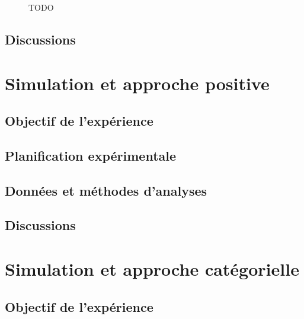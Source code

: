 \begin{figure}[bth]
       \caption[TODO]{TODO}\label{fig:soundlevelMarkerDiff}
\end{figure}

\subsection{Discussions}

\section{Simulation et approche positive}
\label{sec:xp3}

\subsection{Objectif de l'expérience}

\subsection{Planification expérimentale}

\subsection{Données et méthodes d'analyses}

\subsection{Discussions}

\section{Simulation et approche catégorielle}
\label{sec:xp4}

\subsection{Objectif de l'expérience}

